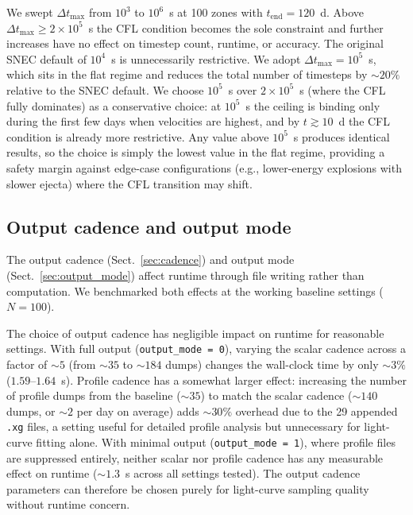 \documentclass[twocolumn,linenumbers]{aastex701}
\begin{document}
We swept $\Delta t_{\mathrm{max}}$ from $10^3$ to $10^6$~s at 100 zones with $t_\mathrm{end} = 120$~d. Above $\Delta t_{\mathrm{max}} \geq 2\times10^5$~s the CFL condition becomes the sole constraint and further increases have no effect on timestep count, runtime, or accuracy. The original SNEC default of $10^4$~s is unnecessarily restrictive. We adopt $\Delta t_{\mathrm{max}} = 10^5$~s, which sits in the flat regime and reduces the total number of timesteps by ${\sim}20\%$ relative to the SNEC default. We choose $10^5$~s over $2\times10^5$~s (where the CFL fully dominates) as a conservative choice: at $10^5$~s the ceiling is binding only during the first few days when velocities are highest, and by $t \gtrsim 10$~d the CFL condition is already more restrictive. Any value above $10^5$~s produces identical results, so the choice is simply the lowest value in the flat regime, providing a safety margin against edge-case configurations (e.g., lower-energy explosions with slower ejecta) where the CFL transition may shift.

\subsection{Output cadence and output mode}
\label{sec:output_cadence_speed}

The output cadence (Sect.~\ref{sec:cadence}) and output mode (Sect.~\ref{sec:output_mode}) affect runtime through file writing rather than computation. We benchmarked both effects at the working baseline settings ($N = 100$).

The choice of output cadence has negligible impact on runtime for reasonable settings. With full output (\texttt{output\_mode\,=\,0}), varying the scalar cadence across a factor of ${\sim}5$ (from ${\sim}35$ to ${\sim}184$ dumps) changes the wall-clock time by only ${\sim}3\%$ ($1.59$--$1.64$~s). Profile cadence has a somewhat larger effect: increasing the number of profile dumps from the baseline (${\sim}35$) to match the scalar cadence (${\sim}140$ dumps, or ${\sim}2$ per day on average) adds ${\sim}30\%$ overhead due to the 29 appended \texttt{.xg} files, a setting useful for detailed profile analysis but unnecessary for light-curve fitting alone. With minimal output (\texttt{output\_mode\,=\,1}), where profile files are suppressed entirely, neither scalar nor profile cadence has any measurable effect on runtime (${\sim}1.3$~s across all settings tested). The output cadence parameters can therefore be chosen purely for light-curve sampling quality without runtime concern.
\end{document}
